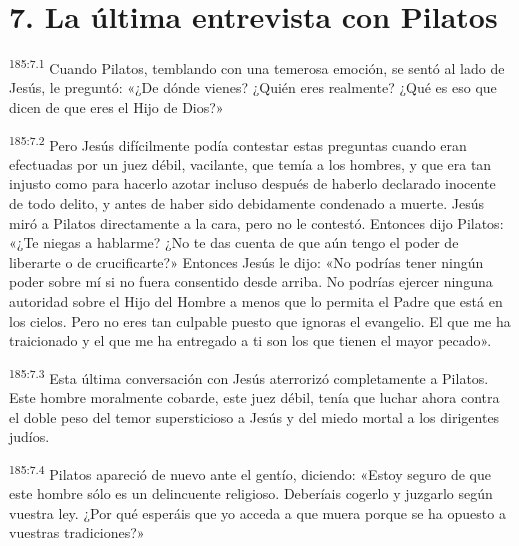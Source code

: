 \section*{7. La última entrevista con Pilatos}
\par 
\textsuperscript{185:7.1} Cuando Pilatos, temblando con una temerosa emoción, se sentó al lado de Jesús, le preguntó: «¿De dónde vienes? ¿Quién eres realmente? ¿Qué es eso que dicen de que eres el Hijo de Dios?»

\par 
\textsuperscript{185:7.2} Pero Jesús difícilmente podía contestar estas preguntas cuando eran efectuadas por un juez débil, vacilante, que temía a los hombres, y que era tan injusto como para hacerlo azotar incluso después de haberlo declarado inocente de todo delito, y antes de haber sido debidamente condenado a muerte. Jesús miró a Pilatos directamente a la cara, pero no le contestó. Entonces dijo Pilatos: «¿Te niegas a hablarme? ¿No te das cuenta de que aún tengo el poder de liberarte o de crucificarte?» Entonces Jesús le dijo: «No podrías tener ningún poder sobre mí si no fuera consentido desde arriba. No podrías ejercer ninguna autoridad sobre el Hijo del Hombre a menos que lo permita el Padre que está en los cielos. Pero no eres tan culpable puesto que ignoras el evangelio. El que me ha traicionado y el que me ha entregado a ti son los que tienen el mayor pecado».

\par 
\textsuperscript{185:7.3} Esta última conversación con Jesús aterrorizó completamente a Pilatos. Este hombre moralmente cobarde, este juez débil, tenía que luchar ahora contra el doble peso del temor supersticioso a Jesús y del miedo mortal a los dirigentes judíos.

\par 
\textsuperscript{185:7.4} Pilatos apareció de nuevo ante el gentío, diciendo: «Estoy seguro de que este hombre sólo es un delincuente religioso. Deberíais cogerlo y juzgarlo según vuestra ley. ¿Por qué esperáis que yo acceda a que muera porque se ha opuesto a vuestras tradiciones?»

